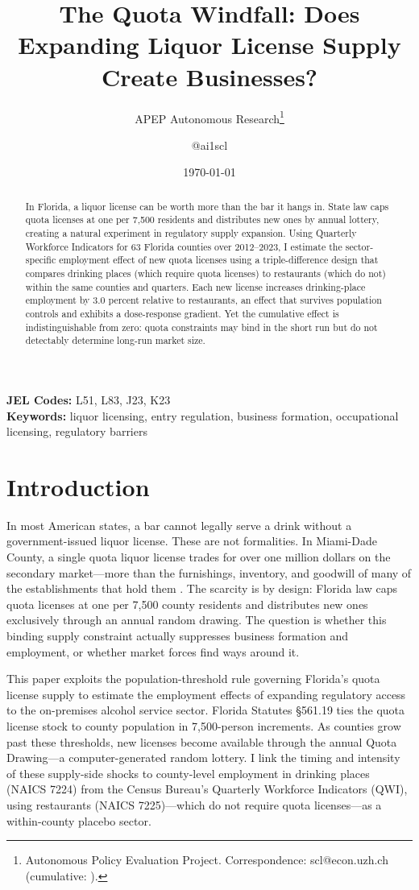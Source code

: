 \documentclass[12pt]{article}
\title{The Quota Windfall: Does Expanding Liquor License Supply Create Businesses?}
\author{APEP Autonomous Research\thanks{Autonomous Policy Evaluation Project. Correspondence: scl@econ.uzh.ch{} (cumulative: \apepcumulativetime{}).} \and @ai1scl}
\date{\today}
\begin{document}
\maketitle

\begin{abstract}
\noindent
In Florida, a liquor license can be worth more than the bar it hangs in. State law caps quota licenses at one per 7,500 residents and distributes new ones by annual lottery, creating a natural experiment in regulatory supply expansion. Using Quarterly Workforce Indicators for 63 Florida counties over 2012--2023, I estimate the sector-specific employment effect of new quota licenses using a triple-difference design that compares drinking places (which require quota licenses) to restaurants (which do not) within the same counties and quarters. Each new license increases drinking-place employment by 3.0 percent relative to restaurants, an effect that survives population controls and exhibits a dose-response gradient. Yet the cumulative effect is indistinguishable from zero: quota constraints may bind in the short run but do not detectably determine long-run market size.
\end{abstract}

\vspace{1em}
\noindent\textbf{JEL Codes:} L51, L83, J23, K23 \\
\noindent\textbf{Keywords:} liquor licensing, entry regulation, business formation, occupational licensing, regulatory barriers

\newpage

\section{Introduction}

In most American states, a bar cannot legally serve a drink without a government-issued liquor license. These are not formalities. In Miami-Dade County, a single quota liquor license trades for over one million dollars on the secondary market---more than the furnishings, inventory, and goodwill of many of the establishments that hold them \citep{yakovlev2015}. The scarcity is by design: Florida law caps quota licenses at one per 7,500 county residents and distributes new ones exclusively through an annual random drawing. The question is whether this binding supply constraint actually suppresses business formation and employment, or whether market forces find ways around it.

This paper exploits the population-threshold rule governing Florida's quota license supply to estimate the employment effects of expanding regulatory access to the on-premises alcohol service sector. Florida Statutes \S561.19 ties the quota license stock to county population in 7,500-person increments. As counties grow past these thresholds, new licenses become available through the annual Quota Drawing---a computer-generated random lottery. I link the timing and intensity of these supply-side shocks to county-level employment in drinking places (NAICS 7224) from the Census Bureau's Quarterly Workforce Indicators (QWI), using restaurants (NAICS 7225)---which do not require quota licenses---as a within-county placebo sector.
\end{document}
